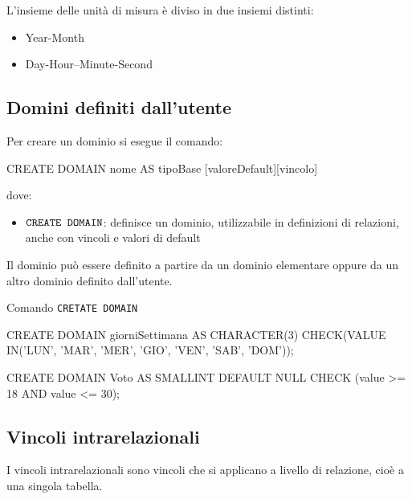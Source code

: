 L'insieme delle unità di misura è diviso in due insiemi distinti:
\begin{itemize}
  \item Year-Month
  \item Day-Hour–Minute-Second
\end{itemize}

\subsection{Domini definiti dall'utente}
Per creare un dominio si esegue il comando:
\begin{codiceSQL}
CREATE DOMAIN nome AS tipoBase [valoreDefault][vincolo]
\end{codiceSQL}

dove:
\begin{itemize}[label=$\triangleright$]
  \item $\verb|CREATE DOMAIN|$: definisce un dominio, utilizzabile in definizioni di relazioni, anche con vincoli e valori di default
\end{itemize}

Il dominio può essere definito a partire da un dominio elementare oppure da un altro dominio definito dall'utente.

\begin{esempiobox}{Comando \texttt{CRETATE DOMAIN}}
\begin{codiceSQL}
CREATE DOMAIN giorniSettimana AS CHARACTER(3)
 CHECK(VALUE IN('LUN', 'MAR', 'MER', 'GIO', 'VEN', 'SAB', 'DOM'));

CREATE DOMAIN Voto AS SMALLINT DEFAULT NULL
 CHECK (value >= 18 AND value <= 30);
\end{codiceSQL}
\end{esempiobox}

\subsection{Vincoli intrarelazionali}
I vincoli intrarelazionali sono vincoli che si applicano a livello di relazione, cioè a una singola tabella.

